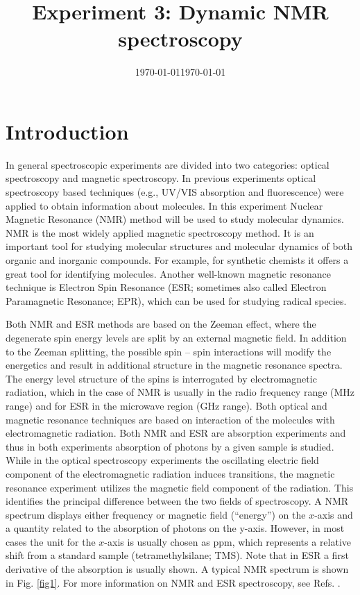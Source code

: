 \documentclass[byrevtex,amssymb,aps,pra,floatfix,letterpaper]{revtex4}
\date{\today}
\begin{document}
\title{Experiment 3: Dynamic NMR spectroscopy}

\date{\today}

\maketitle

\section{Introduction}

In general spectroscopic experiments are divided into two categories: optical spectroscopy and magnetic spectroscopy. In previous experiments optical spectroscopy
based techniques (e.g., UV/VIS absorption and fluorescence) were applied to obtain information about molecules. In this experiment Nuclear Magnetic Resonance (NMR) method will be used to study molecular dynamics. NMR is the most widely applied magnetic spectroscopy method. It is an important tool for studying molecular structures and molecular dynamics of both organic and inorganic compounds. For example, for synthetic chemists it offers a great tool for identifying molecules. Another well-known magnetic resonance technique is Electron Spin Resonance (ESR; sometimes also called Electron Paramagnetic Resonance; EPR), which can be used for studying radical species.

Both NMR and ESR methods are based on the Zeeman effect, where the degenerate spin energy levels are split by an external magnetic field. In addition to the
Zeeman splitting, the possible spin -- spin interactions will modify the energetics and result in additional structure in the magnetic resonance spectra. The energy level structure of the spins is interrogated by electromagnetic radiation, which in the case of NMR is usually in the radio frequency range (MHz range) and for ESR in the microwave region (GHz range). Both optical and magnetic resonance techniques are based on interaction of the molecules with electromagnetic radiation. Both NMR and ESR are absorption experiments and thus in both experiments absorption of photons by a given sample is studied. While in the optical spectroscopy experiments the oscillating electric field component of the electromagnetic radiation induces transitions, the magnetic resonance experiment utilizes the magnetic field component of the radiation. This identifies the principal difference between the two fields of spectroscopy. A NMR spectrum displays either frequency or magnetic field (``energy'') on the $x$-axis and a quantity related to the absorption of photons on the y-axis. However, in most cases the unit for the $x$-axis is usually chosen as ppm, which represents a relative shift from a standard sample (tetramethylsilane; TMS). Note that in ESR a first derivative of the absorption is usually shown. A typical NMR spectrum is shown in Fig. \ref{fig1}. For more information on NMR and ESR spectroscopy, see Refs. \cite{ATKINS1,GUNTHER,WERTZ}.
\end{document}
